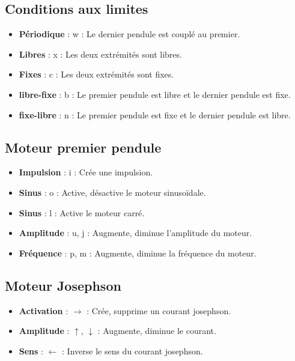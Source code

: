 \subsection{Conditions aux limites}
%
\begin{itemize}[label=, leftmargin=2cm, itemsep=0pt]
\item {\bf Périodique} : {\sf w} : Le dernier pendule est couplé au premier.
\item {\bf Libres} : {\sf x} : Les deux extrémités sont libres.
\item {\bf Fixes} : {\sf c} : Les deux extrémités sont fixes.
\item {\bf libre-fixe} : {\sf b} : Le premier pendule est libre et le dernier pendule est fixe.
\item {\bf fixe-libre} : {\sf n} : Le premier pendule est fixe et le dernier pendule est libre.
\end{itemize}
%
%
\subsection{Moteur premier pendule}
%
\begin{itemize}[label=, leftmargin=2cm, itemsep=0pt]
\item {\bf Impulsion} : {\sf i} : Crée une impulsion.
\item {\bf Sinus} : {\sf o} : Active, désactive le moteur sinusoïdale.
\item {\bf Sinus} : {\sf l} : Active le moteur carré.
\item {\bf Amplitude} : {\sf u, j} :  Augmente, diminue l'amplitude du moteur.
\item {\bf Fréquence} : {\sf p, m} :  Augmente, diminue la fréquence du moteur.
\end{itemize}
%
%
\subsection{Moteur Josephson}
%
\begin{itemize}[label=, leftmargin=2cm, itemsep=0pt]
\item {\bf Activation} : $\rightarrow$ : Crée, supprime un courant josephson.
\item {\bf Amplitude} : $\mathtt{\uparrow}$, $\mathsf{\downarrow}$ : Augmente, diminue le courant.
\item {\bf Sens} : {\sf $\leftarrow$} : Inverse le sens du courant josephson.
\end{itemize}
%
%
